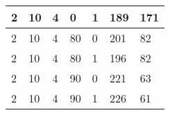 \documentclass{article}
\theoremstyle{definition}
\begin{document}
\begin{table}[]
\begin{tabular}{|l|l|l|l|l|l|l|}
2                                      & 10                                      & 4                                      & 0                                    & 1                                      & 189                                      & 171                                    \\ \hline
2                                      & 10                                      & 4                                      & 80                                   & 0                                      & 201                                      & 82                                     \\ \hline
2                                      & 10                                      & 4                                      & 80                                   & 1                                      & 196                                      & 82                                     \\ \hline
2                                      & 10                                      & 4                                      & 90                                   & 0                                      & 221                                      & 63                                     \\ \hline
2                                      & 10                                      & 4                                      & 90                                   & 1                                      & 226                                      & 61                                     \\ \hline
\end{tabular}
\end{table}
\end{document}
